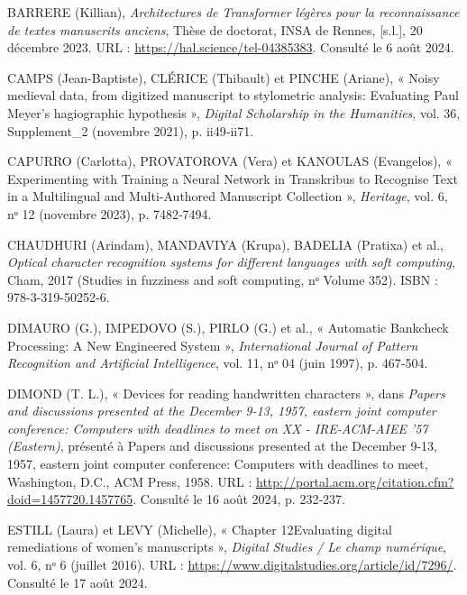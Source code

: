 \documentclass[a4paper,12pt,twoside]{book}
\begin{document}
	\begin{thebibliography}{99}
		
		 \textsc{BARRERE} (Killian), \emph{Architectures de Transformer légères pour la reconnaissance de textes manuscrits anciens}, Thèse de doctorat, INSA de Rennes, [s.l.], 20 décembre 2023. URL : \url{https://hal.science/tel-04385383}. Consulté le 6 août 2024.
		
		 \textsc{CAMPS} (Jean-Baptiste), \textsc{CLÉRICE} (Thibault) et \textsc{PINCHE} (Ariane), « Noisy medieval data, from digitized manuscript to stylometric analysis: Evaluating Paul Meyer’s hagiographic hypothesis », \emph{Digital Scholarship in the Humanities}, vol. 36, Supplement\_2 (novembre 2021), p. ii49‑ii71.
		
		 \textsc{CAPURRO} (Carlotta), \textsc{PROVATOROVA} (Vera) et \textsc{KANOULAS} (Evangelos), « Experimenting with Training a Neural Network in Transkribus to Recognise Text in a Multilingual and Multi-Authored Manuscript Collection », \emph{Heritage}, vol. 6, nᵒ 12 (novembre 2023), p. 7482‑7494.
		
		 \textsc{CHAUDHURI} (Arindam), \textsc{MANDAVIYA} (Krupa), \textsc{BADELIA} (Pratixa) et al., \emph{Optical character recognition systems for different languages with soft computing}, Cham, 2017 (Studies in fuzziness and soft computing, nᵒ Volume 352). ISBN : 978-3-319-50252-6.
		
		 \textsc{DIMAURO} (G.), \textsc{IMPEDOVO} (S.), \textsc{PIRLO} (G.) et al., « Automatic Bankcheck Processing: A New Engineered System », \emph{International Journal of Pattern Recognition and Artificial Intelligence}, vol. 11, nᵒ 04 (juin 1997), p. 467‑504.
		
		 \textsc{DIMOND} (T. L.), « Devices for reading handwritten characters », dans \emph{Papers and discussions presented at the December 9-13, 1957, eastern joint computer conference: Computers with deadlines to meet on XX - IRE-ACM-AIEE ’57 (Eastern)}, présenté à Papers and discussions presented at the December 9-13, 1957, eastern joint computer conference: Computers with deadlines to meet, Washington, D.C., ACM Press, 1958. URL : \url{http://portal.acm.org/citation.cfm?doid=1457720.1457765}. Consulté le 16 août 2024, p. 232‑237.
		
		 \textsc{ESTILL} (Laura) et \textsc{LEVY} (Michelle), « Chapter 12Evaluating digital remediations of women’s manuscripts », \emph{Digital Studies / Le champ numérique}, vol. 6, nᵒ 6 (juillet 2016). URL : \url{https://www.digitalstudies.org/article/id/7296/}. Consulté le 17 août 2024.
		

\end{thebibliography}
\end{document}
